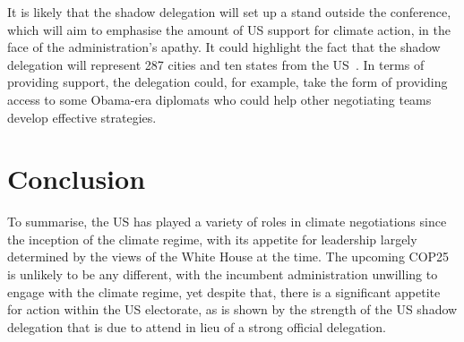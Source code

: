 It is likely that the shadow delegation will set up a stand outside
the conference, which will aim to emphasise the amount of US support
for climate action, in the face of the administration’s apathy. It
could highlight the fact that the shadow delegation will represent 287 cities and ten states from the US~\cite{wearestillin}. In terms of providing
support, the delegation could, for example, take the form of providing
access to some Obama-era diplomats who could help other negotiating
teams develop effective strategies.

\section{Conclusion}

To summarise, the US has played a variety of roles in climate
negotiations since the inception of the climate regime, with its
appetite for leadership largely determined by the views of the White
House at the time. The upcoming COP25 is unlikely to be any different,
with the incumbent administration unwilling to engage with the climate
regime, yet despite that, there is a significant appetite for
action within the US electorate, as is shown by the strength of the US
shadow delegation that is due to attend in lieu of a strong official
delegation.

\nocite{*}


